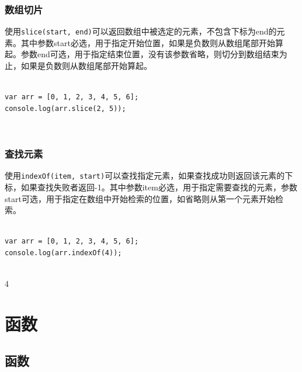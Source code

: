 \subsection{数组切片}

使用\lstinline|slice(start, end)|可以返回数组中被选定的元素，不包含下标为end的元素。其中参数start必选，用于指定开始位置，如果是负数则从数组尾部开始算起。参数end可选，用于指定结束位置，没有该参数省略，则切分到数组结束为止，如果是负数则从数组尾部开始算起。 \\

 \\

\begin{lstlisting}[style=htmlcssjs]
var arr = [0, 1, 2, 3, 4, 5, 6];
console.log(arr.slice(2, 5));
\end{lstlisting}

\begin{tcolorbox}
	 \\
	\text{[2, 3, 4]}
\end{tcolorbox}

\subsection{查找元素}

使用\lstinline|indexOf(item, start)|可以查找指定元素，如果查找成功则返回该元素的下标，如果查找失败者返回-1。其中参数item必选，用于指定需要查找的元素，参数start可选，用于指定在数组中开始检索的位置，如省略则从第一个元素开始检索。 \\

 \\

\begin{lstlisting}[style=htmlcssjs]
var arr = [0, 1, 2, 3, 4, 5, 6];
console.log(arr.indexOf(4));
\end{lstlisting}

\begin{tcolorbox}
	 \\
	4
\end{tcolorbox}

\newpage

\chapter{函数}

\section{函数}

